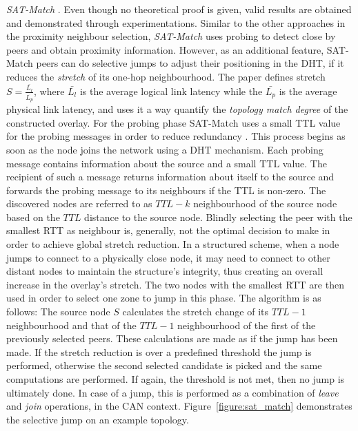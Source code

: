 \emph{SAT-Match} \cite{RGJZ2004}. Even though no theoretical proof is
given, valid results are obtained and demonstrated through experimentations.
Similar to the other approaches in the proximity neighbour selection,
\textit{SAT-Match} uses probing to detect close by peers and obtain proximity
information. However, as an additional feature, SAT-Match peers can do
selective jumps to adjust their positioning in the DHT, if it reduces the
\emph{stretch} of its one-hop neighbourhood. The paper defines stretch
$S = \frac{\bar{L_l}}{\bar{L_p}}$, where $\bar{L_l}$ is the average
logical link latency while the $\bar{L_p}$ is the average physical
link latency, and uses it a way quantify the \emph{topology
match degree} of the constructed overlay. For the probing phase SAT-Match uses a
small TTL value for the probing messages in order to reduce
redundancy \cite{jiang_lightflood_2008}. This process begins as soon as the node
joins the network using a DHT mechanism. Each probing message contains
information about the source and a small TTL value. The recipient of such a
message returns information about itself to the source and forwards the probing
message to its neighbours if the TTL is non-zero. The discovered nodes are
referred to as $TTL-k$ neighbourhood of the source node based on the $TTL$
distance to the source node. Blindly selecting the peer with the smallest RTT
as neighbour is, generally, not the optimal decision to make in order to achieve
global stretch reduction. In a structured scheme, when a node jumps to connect
to a physically close node, it may need to connect to other distant nodes to
maintain the structure's integrity, thus creating an overall increase in the
overlay's stretch. The two nodes with the smallest RTT are then used in order to
select one zone to jump in this phase. The algorithm is as follows: The source
node $S$ calculates the stretch change of its $TTL-1$ neighbourhood and that of
the $TTL-1$ neighbourhood of the first of the previously selected peers. These
calculations are made as if the jump has been made. If the stretch reduction is
over a predefined threshold the jump is performed, otherwise the second selected
candidate is picked and the same computations are performed. If again, the
threshold is not met, then no jump is ultimately done. In case of a jump, this
is performed as a combination of \emph{leave} and \emph{join} operations, in the
CAN context. Figure~\ref{figure:sat_match} demonstrates the selective jump on an
example topology.


